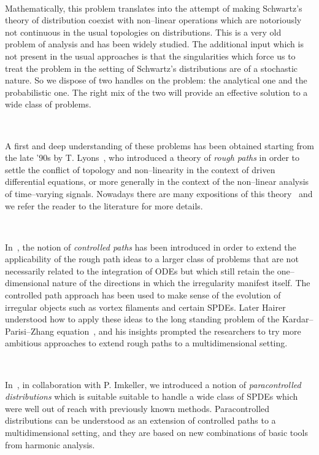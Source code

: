 \documentclass[a4paper,11pt]{article}
\newcommand{\tmem}[1]{{\em #1\/}}
\begin{document}
\

Mathematically, this problem translates into the attempt of making Schwartz's
theory of distribution coexist with non--linear operations which are
notoriously not continuous in the usual topologies on distributions. This is a
very old problem of analysis and has been widely studied. The additional input
which is not present in the usual approaches is that the singularities which
force us to treat the problem in the setting of Schwartz's distributions are
of a stochastic nature. So we dispose of two handles on the problem: the
analytical one and the probabilistic one. The right mix of the two will
provide an effective solution to a wide class of problems.

\

A first and deep understanding of these problems has been obtained starting
from the late '90s by T. Lyons~{\cite{Lyons1998}}, who introduced a theory of
{\tmem{rough paths}} in order to settle the conflict of topology and
non--linearity in the context of driven differential equations, or more
generally in the context of the non--linear analysis of time--varying signals.
Nowadays there are many expositions of this
theory~{\cite{Lyons2002,Friz2010,Lyons2007,Friz2014}} and we refer the reader
to the literature for more details.

\

In~{\cite{Gubinelli2004,Gubinelli2010}}, the notion of {\tmem{controlled
paths}} has been introduced in order to extend the applicability of the rough
path ideas to a larger class of problems that are not necessarily related to
the integration of ODEs but which still retain the one--dimensional nature of
the directions in which the irregularity manifest itself. The controlled path
approach has been used to make sense of the evolution of irregular objects
such as vortex filaments and certain SPDEs. Later Hairer understood how to
apply these ideas to the long standing problem of the Kardar--Parisi--Zhang
equation~{\cite{Hairer2013b}}, and his insights prompted the researchers to
try more ambitious approaches to extend rough paths to a multidimensional
setting.

\

In~{\cite{Gubinelli2012}}, in collaboration with P. Imkeller, we introduced a
notion of {\tmem{paracontrolled distributions}} which is suitable suitable to
handle a wide class of SPDEs which were well out of reach with previously
known methods. Paracontrolled distributions can be understood as an extension
of controlled paths to a multidimensional setting, and they are based on new
combinations of basic tools from harmonic analysis.
\end{document}
